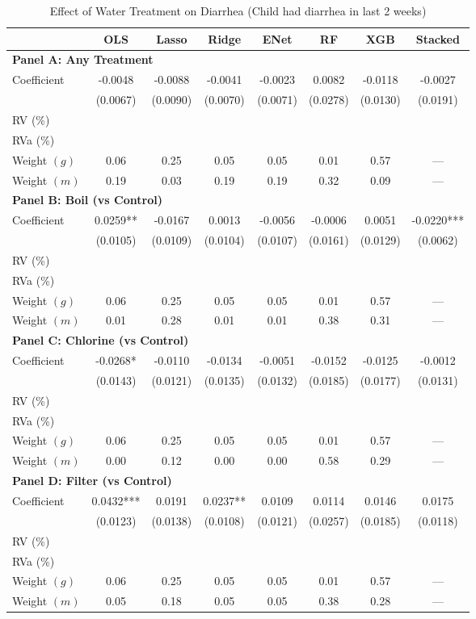 \begin{table}[htbp]
\centering
\caption{Effect of Water Treatment on Diarrhea (Child had diarrhea in last 2 weeks)}
\label{tab:diarrhea_full}
\begin{tabular}{lccccccc}
\toprule
 & OLS & Lasso & Ridge & ENet & RF & XGB & Stacked \\
\midrule
\multicolumn{8}{l}{\textbf{Panel A: Any Treatment}} \\
\midrule
Coefficient & -0.0048 & -0.0088 & -0.0041 & -0.0023 & 0.0082 & -0.0118 & -0.0027 \\
 & (0.0067) & (0.0090) & (0.0070) & (0.0071) & (0.0278) & (0.0130) & (0.0191) \\
RV (\%) \\
RVa (\%) \\
Weight $(g)$ & 0.06 & 0.25 & 0.05 & 0.05 & 0.01 & 0.57 & — \\
Weight $(m)$ & 0.19 & 0.03 & 0.19 & 0.19 & 0.32 & 0.09 & — \\

\multicolumn{8}{l}{\textbf{Panel B: Boil (vs Control)}} \\
\midrule
Coefficient & 0.0259** & -0.0167 & 0.0013 & -0.0056 & -0.0006 & 0.0051 & -0.0220*** \\
 & (0.0105) & (0.0109) & (0.0104) & (0.0107) & (0.0161) & (0.0129) & (0.0062) \\
RV (\%) \\
RVa (\%) \\
Weight $(g)$ & 0.06 & 0.25 & 0.05 & 0.05 & 0.01 & 0.57 & — \\
Weight $(m)$ & 0.01 & 0.28 & 0.01 & 0.01 & 0.38 & 0.31 & — \\

\multicolumn{8}{l}{\textbf{Panel C: Chlorine (vs Control)}} \\
\midrule
Coefficient & -0.0268* & -0.0110 & -0.0134 & -0.0051 & -0.0152 & -0.0125 & -0.0012 \\
 & (0.0143) & (0.0121) & (0.0135) & (0.0132) & (0.0185) & (0.0177) & (0.0131) \\
RV (\%) \\
RVa (\%) \\
Weight $(g)$ & 0.06 & 0.25 & 0.05 & 0.05 & 0.01 & 0.57 & — \\
Weight $(m)$ & 0.00 & 0.12 & 0.00 & 0.00 & 0.58 & 0.29 & — \\

\multicolumn{8}{l}{\textbf{Panel D: Filter (vs Control)}} \\
\midrule
Coefficient & 0.0432*** & 0.0191 & 0.0237** & 0.0109 & 0.0114 & 0.0146 & 0.0175 \\
 & (0.0123) & (0.0138) & (0.0108) & (0.0121) & (0.0257) & (0.0185) & (0.0118) \\
RV (\%) \\
RVa (\%) \\
Weight $(g)$ & 0.06 & 0.25 & 0.05 & 0.05 & 0.01 & 0.57 & — \\
Weight $(m)$ & 0.05 & 0.18 & 0.05 & 0.05 & 0.38 & 0.28 & — \\


\end{tabular}
\end{table}

